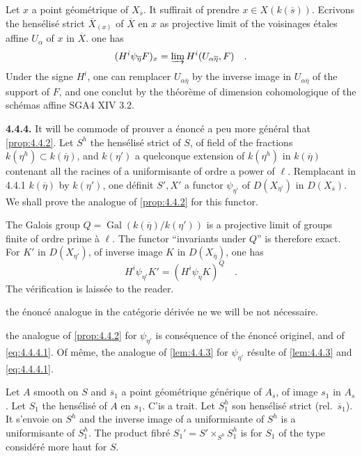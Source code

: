 \documentclass[12pt,a4paper]{article}
\theoremstyle{plain}
\theoremstyle{definition}
\DeclareMathOperator{\Gal}{Gal}
\providecommand{\Gal}{\operatorname{Gal}}
\begin{document}
{{Let $x$ a point g\'{e}om\'{e}trique of $X_{\overline{s}}$. It suffirait of prendre $x \in X(k(\overline{s}))$. Ecrivons the hens\'{e}lis\'{e} strict $\overline{X}_{(x)}$ of $\overline{X}$ en $x$ as projective limit of the voisinages \'{e}tales affine $U_{\alpha}$ of $x$ in $\overline{X}$. one has
\[
(H^{i}\psi_{\overline{\eta}}F)_{x} = \varinjlim H^{i}(U_{\alpha\overline{\eta}}, F)\quad.
\]
Under the signe $H^{i}$, one can remplacer $U_{\alpha\overline{\eta}}$ by the inverse image in $U_{\alpha\overline{\eta}}$ of the support of $F$, and one conclut by the th\'{e}or\`{e}me of dimension cohomologique of the sch\'{e}mas affine SGA4 XIV 3.2.

\noindent\textbf{4.4.4.} It will be commode of prouver a \'{e}nonc\'{e} a peu more g\'{e}n\'{e}ral that \ref{prop:4.4.2}. Let $S^{h}$ the hens\'{e}lis\'{e} strict of $S$, of field of the fractions $k(\eta^{h}) \subset k(\overline{\eta})$, and $k(\eta')$ a quelconque extension of $k(\eta^{h})$ in $k(\overline{\eta})$ contenant all the racines of a uniformisante of ordre a power of $\ell$. Remplacant in 4.4.1 $k(\overline{\eta})$ by $k(\eta')$, one d\'{e}finit $S', X'$ a functor $\psi_{\eta'}$ of $D(X_{\eta'})$ in $D(X_{\overline{s}})$. We shall prove the analogue of \ref{prop:4.4.2} for this functor.

The Galois group $Q = \Gal(k(\overline{\eta})/k(\eta'))$ is a projective limit of groups finite of ordre prime \`{a} $\ell$. The functor ``invariants under $Q$'' is therefore exact. For $K'$ in $D(X_{\eta'})$, of inverse image $K$ in $D(X_{\overline{\eta}})$, one has
\begin{equation}\label{eq:4.4.4.1}
H^{i}\psi_{\eta'}K' = (H^{i}\psi_{\overline{\eta}}K)^{Q}\quad.
\end{equation}
The v\'{e}rification is laiss\'{e}e to the reader.

the \'{e}nonc\'{e} analogue in the cat\'{e}gorie d\'{e}riv\'{e}e ne we will be not n\'{e}cessaire.

the analogue of \ref{prop:4.4.2} for $\psi_{\eta'}$ is cons\'{e}quence of the \'{e}nonc\'{e} originel, and of \eqref{eq:4.4.4.1}. Of m\^{e}me, the analogue of \ref{lem:4.4.3} for $\psi_{\eta'}$ r\'{e}sulte of \ref{lem:4.4.3} and \eqref{eq:4.4.4.1}.

Let $A$ smooth on $S$ and $\overline{s}_{1}$ a point g\'{e}om\'{e}trique g\'{e}n\'{e}rique of $A_{\overline{s}}$, of image $s_{1}$ in $A_{s}$. Let $S_{1}$ the hens\'{e}lis\'{e} of $A$ en $s_{1}$. C'is a trait. Let $S_{1}^{h}$ son hens\'{e}lis\'{e} strict (rel.\ $\overline{s}_{1}$). It s'envoie on $S^{h}$ and the inverse image of a uniformisante of $S^{h}$ is a uniformisante of $S_{1}^{h}$. The product fibr\'{e} $S_{1}' = S' \times_{S^{h}} S_{1}^{h}$ is for $S_{1}$ of the type consid\'{e}r\'{e} more haut for $S$.

}}
\end{document}
